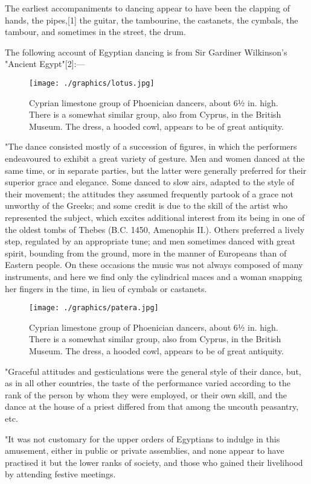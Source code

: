 The earliest accompaniments to dancing appear to have been the clapping of hands, the pipes,[1] the guitar, the tambourine, the castanets, the cymbals, the tambour, and sometimes in the street, the drum.

The following account of Egyptian dancing is from Sir Gardiner Wilkinson's "Ancient Egypt"[2]:—
\begin{figure}
   \texttt{[image: ./graphics/lotus.jpg]} 
   \caption{\small Cyprian limestone group of Phoenician dancers, about 6½ in. high. There is a somewhat similar group, also from Cyprus, in the British Museum. The dress, a hooded cowl, appears to be of great antiquity.}
\end{figure}
"The dance consisted mostly of a succession of figures, in which the performers endeavoured to exhibit a great variety of gesture. Men and women danced at the same time, or in separate parties, but the latter were generally preferred for their superior grace and elegance. Some danced to slow airs, adapted to the style of their movement; the attitudes they assumed frequently partook of a grace not unworthy of the Greeks; and some credit is due to the skill of the artist who represented the subject, which excites additional interest from its being in one of the oldest tombs of Thebes (B.C. 1450, Amenophis II.). Others preferred a lively step, regulated by an appropriate tune; and men sometimes danced with great spirit, bounding from the ground, more in the manner of Europeans than of Eastern people. On these occasions the music was not always composed of many instruments, and here we find only the cylindrical maces and a woman snapping her fingers in the time, in lieu of cymbals or castanets.

\begin{figure}
   \texttt{[image: ./graphics/patera.jpg]} 
   \caption{\small Cyprian limestone group of Phoenician dancers, about 6½ in. high. There is a somewhat similar group, also from Cyprus, in the British Museum. The dress, a hooded cowl, appears to be of great antiquity.}
\end{figure}

"Graceful attitudes and gesticulations were the general style of their dance, but, as in all other countries, the taste of the performance varied according to the rank of the person by whom they were employed, or their own skill, and the dance at the house of a priest differed from that among the uncouth peasantry, etc.

"It was not customary for the upper orders of Egyptians to indulge in this amusement, either in public or private assemblies, and none appear to have practised it but the lower ranks of society, and those who gained their livelihood by attending festive meetings.

